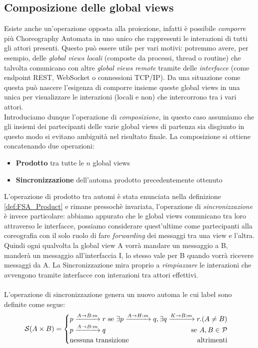 \subsection{Composizione delle global views}
Esiste anche un'operazione opposta alla proiezione, infatti è possibile \emph{comporre}\cite{CA_Composition} più Choreography Automata in uno unico che rappresenti le interazioni di tutti gli attori presenti. Questo può essere utile per vari motivi: potremmo avere, per esempio, delle \emph{global views locali} (composte da processi, thread o routine) che talvolta comunicano con altre \emph{global views remote} tramite delle \emph{interfacce} (come endpoint REST, WebSocket o connessioni TCP/IP). Da una situazione come questa può nascere l'esigenza di comporre insieme queste global views in una unica per visualizzare le interazioni (locali e non) che intercorrono tra i vari attori.\\
Introduciamo dunque l'operazione di \emph{composizione}, in questo caso assumiamo che gli insiemi dei partecipanti delle varie global views di partenza sia disgiunto in questo modo si evitano ambiguità nel risultato finale. La composizione si ottiene concatenando due operazioni:
\begin{itemize}
    \item \textbf{Prodotto} tra tutte le $n$ global views
    \item \textbf{Sincronizzazione} dell'automa prodotto precedentemente ottenuto
\end{itemize}
L'operazione di prodotto tra automi è stata enunciata nella definizione \ref{def:FSA_Product} e rimane pressochè invariata, l'operazione di \emph{sincronizzazione} è invece particolare: abbiamo appurato che le global views comunicano tra loro attraverso le interfacce, possiamo considerare quest'ultime come partecipanti alla coreografia con il solo ruolo di fare \emph{forwarding} dei messaggi tra una view e l'altra. Quindi ogni qualvolta la global view A vorrà mandare un messaggio a B, manderà un messaggio all'interfaccia I, lo stesso vale per B quando vorrà ricevere messaggi da A. La Sincronizzazione mira proprio a \emph{rimpiazzare} le interazioni che avvengono tramite interfacce con interazioni tra attori effettivi.\\\\
L'operazione di sincronizzazione genera un nuovo automa le cui label sono definite come segue:
\begin{equation*}
    \mathcal{S}(A \times B) =
    \begin{cases}
        p \xrightarrow{A \rightarrow B: m} r \hfill \text{ se } \exists p \xrightarrow{A \rightarrow H: m} q, \exists  q \xrightarrow{K \rightarrow B: m} r. (A \neq B) \\
        p \xrightarrow{A \rightarrow B: m} q \hfill \text{ se } A, B\in \mathcal{P}                                                                                     \\
        \text{nessuna transizione} \hfill \text{altrimenti}
    \end{cases}
\end{equation*}

